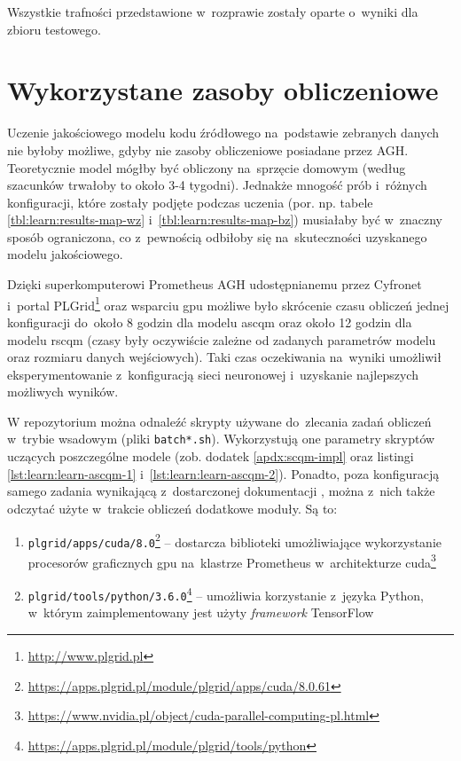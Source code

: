 \documentclass[twoside]{praca}
\begin{document}
Wszystkie trafności przedstawione w~rozprawie zostały oparte o~wyniki dla zbioru testowego.

\section{Wykorzystane zasoby obliczeniowe}

Uczenie jakościowego modelu kodu źródłowego na~podstawie zebranych danych nie byłoby możliwe, gdyby nie zasoby obliczeniowe posiadane przez AGH. Teoretycznie model mógłby być obliczony na~sprzęcie domowym (według szacunków trwałoby to około 3-4 tygodni). Jednakże mnogość prób i~różnych konfiguracji, które zostały podjęte podczas uczenia (por. np. tabele \ref{tbl:learn:results-map-wz} i~\ref{tbl:learn:results-map-bz}) musiałaby być w~znaczny sposób ograniczona, co z~pewnością odbiłoby się na~skuteczności uzyskanego modelu jakościowego.

Dzięki superkomputerowi Prometheus AGH udostępnianemu przez Cyfronet i~portal PLGrid\footnote{\url{http://www.plgrid.pl}} oraz wsparciu \gls{gpu} możliwe było skrócenie czasu obliczeń jednej konfiguracji do~około 8 godzin dla modelu \gls{ascqm} oraz około 12 godzin dla modelu \gls{rscqm} (czasy były oczywiście zależne od zadanych parametrów modelu oraz rozmiaru danych wejściowych). Taki czas oczekiwania na~wyniki umożliwił eksperymentowanie z~konfiguracją sieci neuronowej i~uzyskanie najlepszych możliwych wyników.


W repozytorium \cite{fracz:code-quality-tf} można odnaleźć skrypty używane do~zlecania zadań obliczeń w~trybie wsadowym (pliki \texttt{batch*.sh}). Wykorzystują one parametry skryptów uczących poszczególne modele (zob. dodatek \ref{apdx:scqm-impl} oraz listingi \ref{lst:learn:learn-ascqm-1} i~\ref{lst:learn:learn-ascqm-2}). Ponadto, poza konfiguracją samego zadania wynikającą z~dostarczonej dokumentacji \cite{cyfronet:prometheus-podstawy}, można z~nich także odczytać użyte w~trakcie obliczeń dodatkowe moduły. Są to:

\begin{enumerate}
    \item \texttt{plgrid/apps/cuda/8.0}\footnote{\url{https://apps.plgrid.pl/module/plgrid/apps/cuda/8.0.61}} -- dostarcza biblioteki umożliwiające wykorzystanie procesorów graficznych \gls{gpu} na~klastrze Prometheus w~architekturze \gls{cuda}\footnote{\url{https://www.nvidia.pl/object/cuda-parallel-computing-pl.html}}
    \item \texttt{plgrid/tools/python/3.6.0}\footnote{\url{https://apps.plgrid.pl/module/plgrid/tools/python}} -- umożliwia korzystanie z~języka Python, w~którym zaimplementowany jest użyty \textit{framework} TensorFlow
\end{enumerate}
\end{document}
